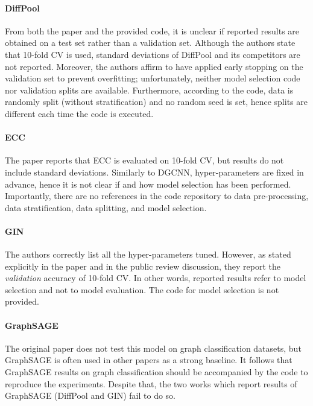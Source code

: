 \documentclass{article}
\begin{document}
\paragraph{DiffPool} From both the paper and the provided code, it is unclear if reported results are obtained on a test set rather than a validation set. Although the authors state that 10-fold CV is used, standard deviations of DiffPool and its competitors are not reported. Moreover, the authors affirm to have applied early stopping on the validation set to prevent overfitting; unfortunately, neither model selection code nor validation splits are available. Furthermore, according to the code, data is randomly split (without stratification) and no random seed is set, hence splits are different each time the code is executed.
\paragraph{ECC} The paper reports that ECC is evaluated on 10-fold CV, but results do not include standard deviations. Similarly to DGCNN, hyper-parameters are fixed in advance, hence it is not clear if and how model selection has been performed. Importantly, there are no references in the code repository to data pre-processing, data stratification, data splitting, and model selection. \paragraph{GIN} The authors correctly list all the hyper-parameters tuned. However, as stated explicitly in the paper and in the public review discussion, they report the \textit{validation} accuracy of 10-fold CV. In other words, reported results refer to model selection and not to model evaluation. The code for model selection is not provided.
\paragraph{GraphSAGE} The original paper does not test this model on graph classification datasets, but GraphSAGE is often used in other papers as a strong baseline. It follows that GraphSAGE results on graph classification should be accompanied by the code to reproduce the experiments. Despite that, the two works which report results of GraphSAGE (DiffPool and GIN) fail to do so.
\end{document}

